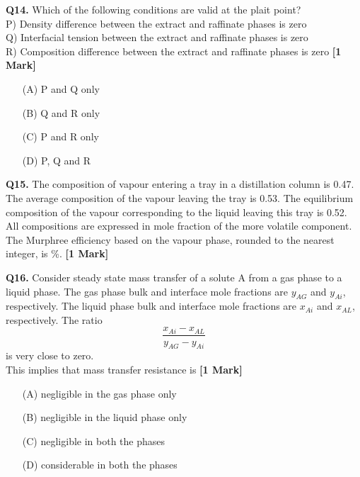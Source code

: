 \documentclass[11pt]{article}
\newcommand{\questiona}[2]{
    \noindent\textbf{Q#2.} #1 \hfill \textbf{[1 Mark]}
}
\begin{document}
\questiona{Which of the following conditions are valid at the plait point?  
\\ P) Density difference between the extract and raffinate phases is zero  
\\ Q) Interfacial tension between the extract and raffinate phases is zero  
\\ R) Composition difference between the extract and raffinate phases is zero}{14}
\begin{enumerate}
    \item[(A)] P and Q only  
    \item[(B)] Q and R only  
    \item[(C)] P and R only  
    \item[(D)] P, Q and R  
\end{enumerate}
\vspace{0.5cm}

\questiona{The composition of vapour entering a tray in a distillation column is 0.47. The average composition of the vapour leaving the tray is 0.53. The equilibrium composition of the vapour corresponding to the liquid leaving this tray is 0.52. All compositions are expressed in mole fraction of the more volatile component. \\  
The Murphree efficiency based on the vapour phase, rounded to the nearest integer, is \%.}{15}
\vspace{0.5cm}

\questiona{Consider steady state mass transfer of a solute A from a gas phase to a liquid phase. The gas phase bulk and interface mole fractions are \( y_{AG} \) and \( y_{Ai} \), respectively. The liquid phase bulk and interface mole fractions are \( x_{Ai} \) and \( x_{AL} \), respectively. The ratio  
\[
\frac{x_{Ai} - x_{AL}}{y_{AG} - y_{Ai}}
\]  
is very close to zero. \\  
This implies that mass transfer resistance is}{16}
\begin{enumerate}
    \item[(A)] negligible in the gas phase only  
    \item[(B)] negligible in the liquid phase only  
    \item[(C)] negligible in both the phases  
    \item[(D)] considerable in both the phases  
\end{enumerate}
\vspace{0.5cm}
\end{document}
